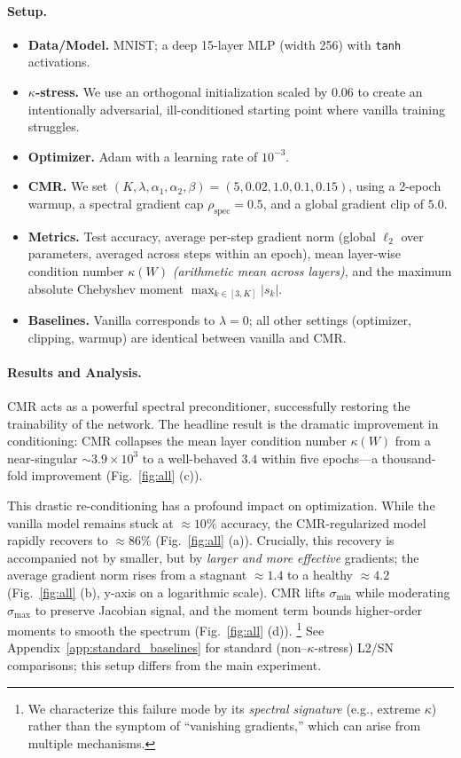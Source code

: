 \documentclass{opt2025}
\newcommand{\cmr}{\textsc{CMR}\xspace}
\begin{document}
\paragraph{Setup.}
\begin{itemize}
    \item \textbf{Data/Model.} MNIST; a deep 15-layer MLP (width 256) with \texttt{tanh} activations.
    \item \textbf{$\kappa$-stress.} We use an orthogonal initialization scaled by $0.06$ to create an intentionally adversarial, ill-conditioned starting point where vanilla training struggles.
    \item \textbf{Optimizer.} Adam with a learning rate of $10^{-3}$.
    \item \textbf{\cmr.} We set $(K,\lambda,\alpha_1,\alpha_2,\beta)=(5,0.02,1.0,0.1,0.15)$, using a 2-epoch warmup, a spectral gradient cap $\rho_{\text{spec}}=0.5$, and a global gradient clip of $5.0$.
    \item \textbf{Metrics.} Test accuracy, average per-step gradient norm (global $\ell_2$ over parameters, averaged across steps within an epoch), mean layer-wise condition number $\kappa(W)$ \emph{(arithmetic mean across layers)}, and the maximum absolute Chebyshev moment $\max_{k\in[3,K]}|s_k|$.
    \item \textbf{Baselines.} Vanilla corresponds to $\lambda{=}0$; all other settings (optimizer, clipping, warmup) are identical between vanilla and \cmr.
\end{itemize}

\paragraph{Results and Analysis.}
\cmr acts as a powerful spectral preconditioner, successfully restoring the trainability of the network. The headline result is the dramatic improvement in conditioning: \cmr collapses the mean layer condition number $\kappa(W)$ from a near-singular $\sim\!3.9\times 10^3$ to a well-behaved $3.4$ within five epochs—a thousand-fold improvement (Fig.~\ref{fig:all} (c)).

\noindent This drastic re-conditioning has a profound impact on optimization. While the vanilla model remains stuck at $\approx\!10\%$ accuracy, the \cmr-regularized model rapidly recovers to $\approx\!86\%$ (Fig.~\ref{fig:all} (a)). Crucially, this recovery is accompanied not by smaller, but by \emph{larger and more effective} gradients; the average gradient norm rises from a stagnant $\approx\!1.4$ to a healthy $\approx\!4.2$ (Fig.~\ref{fig:all} (b), y-axis on a logarithmic scale). \cmr lifts $\sigma_{\min}$ while moderating $\sigma_{\max}$ to preserve Jacobian signal, and the moment term bounds higher-order moments to smooth the spectrum (Fig.~\ref{fig:all} (d)).
\footnote{We characterize this failure mode by its \emph{spectral signature} (e.g., extreme $\kappa$) rather than the symptom of “vanishing gradients,” which can arise from multiple mechanisms.} See Appendix~\ref{app:standard_baselines} for standard (non–$\kappa$-stress) L2/SN comparisons; this setup differs from the main experiment.
\end{document}
